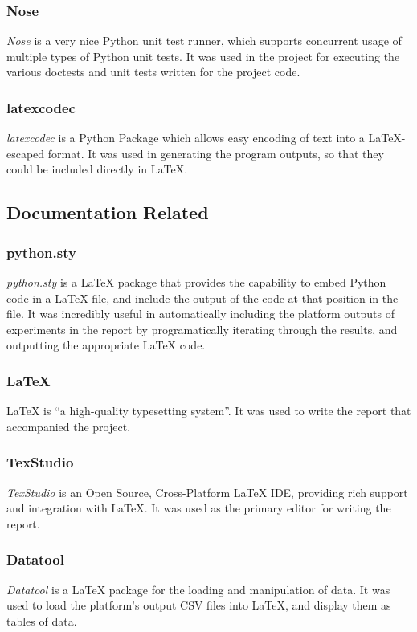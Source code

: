 \documentclass[a4paper,11pt]{report}
\begin{document}
\subsubsection*{Nose}
\emph{Nose} \citep{prog:nose} is a very nice Python unit test runner, which supports concurrent usage of multiple types of Python unit tests. It was used in the project for executing the various doctests and unit tests written for the project code.

\subsubsection*{latexcodec}
\emph{latexcodec} \citep{prog:latexcodec} is a Python Package which allows easy encoding of text into a \LaTeX{}-escaped format. It was used in generating the program outputs, so that they could be included directly in \LaTeX{}.

\subsection{Documentation Related}

\subsubsection*{python.sty}
\emph{python.sty} \citep{prog:pythonsty} is a \LaTeX{} package that provides the capability to embed Python code in a \LaTeX{} file, and include the output of the code at that position in the file. It was incredibly useful in automatically including the platform outputs of experiments in the report by programatically iterating through the results, and outputting the appropriate \LaTeX{} code.

\subsubsection*{\LaTeX{}}
\LaTeX{} \citep{prog:latex} is ``a high-quality typesetting system''. It was used to write the report that accompanied the project.

\subsubsection*{TexStudio}
\emph{TexStudio} \citep{prog:texstudio} is an Open Source, Cross-Platform \LaTeX{} IDE, providing rich support and integration with \LaTeX{}. It was used as the primary editor for writing the report.

\subsubsection*{Datatool}
\emph{Datatool} \citep{prog:datatool} is a \LaTeX{} package for the loading and manipulation of data. It was used to load the platform's output CSV files into \LaTeX{}, and display them as tables of data.
\end{document}
